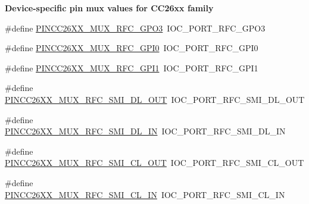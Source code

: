 \begin{Indent}{\bf Device-\/specific pin mux values for C\+C26xx family}
\begin{DoxyCompactItemize}
\item 
\#define \hyperlink{_p_i_n_c_c26_x_x_8h_adc5890a2a1333e956349ed23bbe49d10}{P\+I\+N\+C\+C26\+X\+X\+\_\+\+M\+U\+X\+\_\+\+R\+F\+C\+\_\+\+G\+P\+O3}~I\+O\+C\+\_\+\+P\+O\+R\+T\+\_\+\+R\+F\+C\+\_\+\+G\+P\+O3
\item 
\#define \hyperlink{_p_i_n_c_c26_x_x_8h_acb09fb065bb0d5951baa8a6441471854}{P\+I\+N\+C\+C26\+X\+X\+\_\+\+M\+U\+X\+\_\+\+R\+F\+C\+\_\+\+G\+P\+I0}~I\+O\+C\+\_\+\+P\+O\+R\+T\+\_\+\+R\+F\+C\+\_\+\+G\+P\+I0
\item 
\#define \hyperlink{_p_i_n_c_c26_x_x_8h_a71f92d2ec8410256434ce0968476a749}{P\+I\+N\+C\+C26\+X\+X\+\_\+\+M\+U\+X\+\_\+\+R\+F\+C\+\_\+\+G\+P\+I1}~I\+O\+C\+\_\+\+P\+O\+R\+T\+\_\+\+R\+F\+C\+\_\+\+G\+P\+I1
\item 
\#define \hyperlink{_p_i_n_c_c26_x_x_8h_ad92f4bc3d98cd1363bac0beb6238c7c2}{P\+I\+N\+C\+C26\+X\+X\+\_\+\+M\+U\+X\+\_\+\+R\+F\+C\+\_\+\+S\+M\+I\+\_\+\+D\+L\+\_\+\+O\+U\+T}~I\+O\+C\+\_\+\+P\+O\+R\+T\+\_\+\+R\+F\+C\+\_\+\+S\+M\+I\+\_\+\+D\+L\+\_\+\+O\+U\+T
\item 
\#define \hyperlink{_p_i_n_c_c26_x_x_8h_abb958dd1da8d7fab19495a9d70cfc2cb}{P\+I\+N\+C\+C26\+X\+X\+\_\+\+M\+U\+X\+\_\+\+R\+F\+C\+\_\+\+S\+M\+I\+\_\+\+D\+L\+\_\+\+I\+N}~I\+O\+C\+\_\+\+P\+O\+R\+T\+\_\+\+R\+F\+C\+\_\+\+S\+M\+I\+\_\+\+D\+L\+\_\+\+I\+N
\item 
\#define \hyperlink{_p_i_n_c_c26_x_x_8h_a23575044cc0b9a4ce8b680339672f024}{P\+I\+N\+C\+C26\+X\+X\+\_\+\+M\+U\+X\+\_\+\+R\+F\+C\+\_\+\+S\+M\+I\+\_\+\+C\+L\+\_\+\+O\+U\+T}~I\+O\+C\+\_\+\+P\+O\+R\+T\+\_\+\+R\+F\+C\+\_\+\+S\+M\+I\+\_\+\+C\+L\+\_\+\+O\+U\+T
\item 
\#define \hyperlink{_p_i_n_c_c26_x_x_8h_af897af5e1ed1dff451e4ae505eea3f2d}{P\+I\+N\+C\+C26\+X\+X\+\_\+\+M\+U\+X\+\_\+\+R\+F\+C\+\_\+\+S\+M\+I\+\_\+\+C\+L\+\_\+\+I\+N}~I\+O\+C\+\_\+\+P\+O\+R\+T\+\_\+\+R\+F\+C\+\_\+\+S\+M\+I\+\_\+\+C\+L\+\_\+\+I\+N
\end{DoxyCompactItemize}
\end{Indent}

